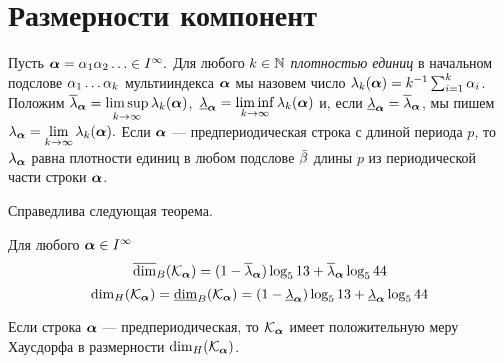 \section{Размерности компонент}

Пусть ${\bm{\alpha}}=\alpha_1 \alpha_2 \ldots\in I^\infty.$ 
Для любого $k \in\mathbb{N}$ {\em плотностью единиц} в начальном подслове $\alpha_{1}\ldots\alpha_{k}$ мультииндекса ${\bm{\alpha}}$ мы назовем число $\lambda_{k}({\bm{\alpha}})=k^{-1}\sum_{i=1}^k\alpha_i$. 
Положим $\overline{\lambda}_{\bm{\alpha}}=\limsup\limits_{k\to\infty}{\lambda_{k}({\bm{\alpha}})}$,\ $\underline{\lambda}_{\bm{\alpha}}=\liminf\limits_{k\to\infty}{\lambda_{k}({\bm{\alpha}})}$ и, если $\underline{\lambda}_{\bm{\alpha}}=\overline{\lambda}_{\bm{\alpha}}$, мы пишем $\lambda_{\bm{\alpha}}=\lim\limits_{k\to\infty}{\lambda_{k}({\bm{\alpha}})}.$
Если ${\bm{\alpha}}$ --- предпериодическая строка с длиной периода $p$, то $\lambda_{\bm{\alpha}}$ равна плотности единиц в любом подслове $\bar{\beta}$ длины $p$ из периодической части строки ${\bm{\alpha}}$.\smallskip

Справедлива  следующая  теорема.
\begin{theorem}\label{tdim}
Для любого ${\bm{\alpha}}\in I^\infty$
$$\overline{\dim}_B({\mathcal K}_{\bm{\alpha}})=(1-\overline{\lambda}_{\bm{\alpha}})\log_513+\overline{\lambda}_{\bm{\alpha}}\log_544$$
$$\dim_H({\mathcal K}_{\bm{\alpha}})=\underline{\dim}_B({\mathcal K}_{\bm{\alpha}})=(1-\underline{\lambda}_{\bm{\alpha}})\log_513+\underline{\lambda}_{\bm{\alpha}}\log_544$$

Если строка ${\bm{\alpha}}$ --- предпериодическая, то ${\mathcal K}_{\bm{\alpha}}$ имеет положительную меру Хаусдорфа в размерности $\dim_H({\mathcal K}_{\bm{\alpha}})$.
\end{theorem}

